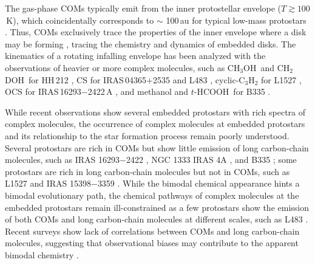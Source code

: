 \documentclass[twocolumn]{aastex62}
\newcommand{\methanol}{\mbox{CH$_{3}$OH}}
\newcommand{\dmethanol}{\mbox{CH$_{2}$DOH}}
\newcommand{\thcooh}{\mbox{$t$-HCOOH}}
\begin{document}
The gas-phase COMs typically emit from the inner protostellar envelope ($T\gtrsim100$\,K), which coincidentally corresponds to $\sim$ 100\,au for typical low-mass protostars \citep{2020ApJ...891...61Y}.  Thus, COMs exclusively trace the properties of the inner envelope where a disk may be forming \citep{2013ChRv..113.8961A,2014Natur.507...78S}, tracing the chemistry and dynamics of embedded disks.  The kinematics of a rotating infalling envelope has been analyzed with the observations of heavier or more complex molecules, such as \methanol\ and \dmethanol\ for HH\,212 \citep{2017ApJ...843...27L}, CS for IRAS\,04365$+$2535 \citep{2016ApJ...820L..34S} and L483 \citep{2017ApJ...837..174O}, cyclic-C$_{3}$H$_{2}$ for L1527 \citep{2014Natur.507...78S}, OCS for IRAS\,16293$-$2422\,A \citep{2016ApJ...824...88O}, and methanol and \thcooh\ for B335 \citep{2019ApJ...873L..21I}.

While recent observations show several embedded protostars with rich spectra of complex molecules, the occurrence of complex molecules at embedded protostars and its relationship to the star formation process remain poorly understood.  Several protostars are rich in COMs but show little emission of long carbon-chain molecules, such as IRAS 16293$-$2422 \citep{2016AA...595A.117J}, NGC 1333 IRAS 4A \citep{2004ApJ...615..354B,2019ApJ...872..196S}, and B335 \citep{2016ApJ...830L..37I,2019ApJ...873L..21I}; some protostars are rich in long carbon-chain molecules but not in COMs, such as L1527 \citep{2010ApJ...722.1633S} and IRAS 15398$-$3359 \citep{2009ApJ...697..769S}.  While the bimodal chemical appearance hints a bimodal evolutionary path, the chemical pathways of complex molecules at the embedded protostars remain ill-constrained as a few protostars show the emission of both COMs and long carbon-chain molecules at different scales, such as L483 \citep{2017ApJ...837..174O}.  Recent surveys show lack of correlations between COMs and long carbon-chain molecules, suggesting that observational biases may contribute to the apparent bimodal chemistry \citep{2016ApJ...833..125G,2018ApJS..236...52H}.
\end{document}
